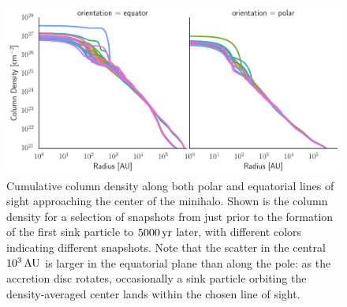 \documentclass[../thesis.tex]{subfiles}
\begin{document}
\begin{figure}
\begin{center}
\includegraphics[width=\columnwidth]{figures/optical_depth/column_density}
\caption{\label{fig:column_density} Cumulative column density along both polar and equatorial lines of sight approaching the center of the minihalo.  Shown is the column density for a selection of snapshots from just prior to the formation of the first sink particle to $5000\,\mathrm{yr}$ later, with different colors indicating different snapshots.  Note that the scatter in the central $10^3\,\mathrm{AU}$ is larger in the equatorial plane than along the pole: as the accretion disc rotates, occasionally a sink particle orbiting the density-averaged center lands within the chosen line of sight.}
\end{center}
\end{figure}

\end{document}
